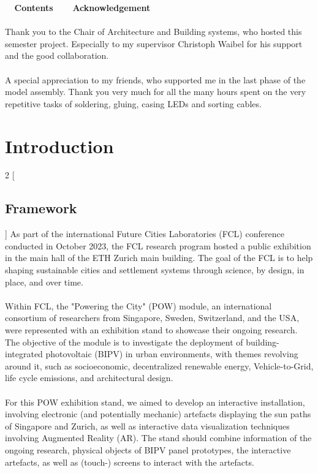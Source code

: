 \documentclass[a4paper,9pt]{article}
\begin{document}
\newpage
\restoregeometry
\thispagestyle{empty}

\vspace{1cm}
\noindent\hrulefill $\;\;\;\;${\Large \textbf{Contents}}$\;\;\;$ \noindent\hrulefill
\setcounter{tocdepth}{2}
\renewcommand*\contentsname{$\;$}
\large
\tableofcontents
{}
\normalsize
\vspace{3cm}
\noindent\hrulefill $\;\;\;\;${\Large \textbf{Acknowledgement}}$\;\;\;$\noindent\hrulefill \\
\\[1cm]
Thank you to the Chair of Architecture and Building systems, who hosted this semester project. Especially to my supervisor Christoph Waibel for his support and the good collaboration.\\
\\
A special appreciation to my friends, who  supported me in the last phase of the model assembly. Thank you very much for all the many hours spent on the very repetitive tasks of soldering, gluing, casing LEDs and sorting cables.

\newpage
\section{Introduction}
\begin{multicols}{2}
[
\subsection{Framework}
]
As part of the international Future Cities Laboratories (FCL) conference conducted in October 2023, the FCL research program hosted a public exhibition in the main hall of the ETH Zurich main building. The goal of the FCL is to help shaping sustainable cities and settlement systems through science, by design, in place, and over time.\\
\\
Within FCL, the "Powering the City" (POW) module, an international consortium of researchers from Singapore, Sweden, Switzerland, and the USA, were represented with an exhibition stand to showcase their ongoing research. The objective of the module is to investigate the deployment of building-integrated photovoltaic (BIPV) in urban environments, with themes revolving around it, such as socioeconomic, decentralized renewable energy, Vehicle-to-Grid, life cycle emissions, and architectural design.\\
\\
For this POW exhibition stand, we aimed to develop an interactive installation, involving electronic (and potentially mechanic) artefacts displaying the sun paths of Singapore and Zurich, as well as interactive data visualization techniques involving Augmented Reality (AR). The stand should combine information of the ongoing research, physical objects of BIPV panel prototypes, the interactive artefacts, as well as (touch-) screens to interact with the artefacts.
\end{multicols}
\end{document}
